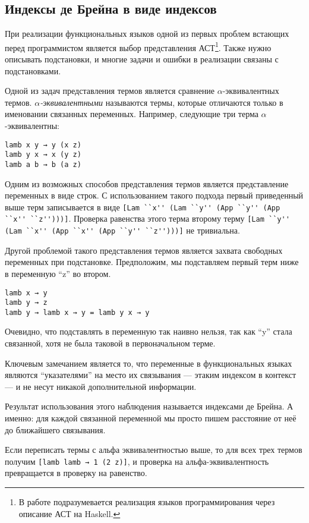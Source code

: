 \subsection{Индексы де Брейна в виде индексов}\label{de_brujin}
При реализации функциональных языков одной из первых проблем встающих перед программистом является выбор представления АСТ\footnote{В работе подразумевается реализация языков программирования через описание АСТ на Haskell.}. Также нужно описывать подстановки, и многие задачи и ошибки в реализации связаны с подстановками.

Одной из задач представления термов является сравнение $\alpha$-эквивалентных термов. \textit{$\alpha$-эквивалентными} называются термы, которые отличаются только в именовании связанных переменных. Например, следующие три терма $\alpha$-эквивалентны:

\begin{lstlisting}
lamb x y → y (x z)
lamb y x → x (y z)
lamb a b → b (a z)
\end{lstlisting}

Одним из возможных способов представления термов является представление переменных в виде строк. С использованием такого подхода первый приведенный выше терм записывается в виде \lstinline{[Lam ``x'' (Lam ``y'' (App ``y'' (App ``x'' ``z'')))]}. Проверка равенства этого терма второму терму \lstinline{[Lam ``y'' (Lam ``x'' (App ``x'' (App ``y'' ``z'')))]} не тривиальна.

Другой проблемой такого представления термов является захвата свободных переменных при подстановке. Предположим, мы подставляем первый терм ниже в переменную ``z'' во втором.
\begin{lstlisting}
lamb x → y
lamb y → z
lamb y → lamb x → y = lamb y x → y
\end{lstlisting}

Очевидно, что подставлять в переменную так наивно нельзя, так как ``y'' стала связанной, хотя не была таковой в первоначальном терме.

Ключевым замечанием является то, что переменные в функциональных языках являются ``указателями'' на место их связывания --- этаким индексом в контекст --- и не несут никакой дополнительной информации.

Результат использования этого наблюдения называется индексами де Брейна. А именно: для каждой связанной переменной мы просто пишем расстояние от неё до ближайшего связывания.

Если переписать термы с альфа эквивалентностью выше, то для всех трех термов получим \lstinline{[lamb lamb → 1 (2 z)]}, и проверка на альфа-эквивалентность превращается в проверку на равенство.

